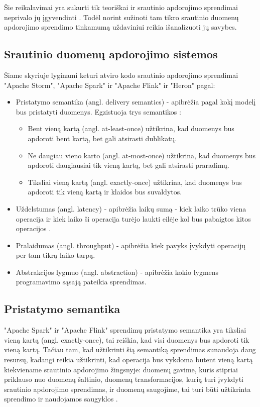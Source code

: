 \documentclass{VUMIFPSbakalaurinis}
\begin{document}
Šie reikalavimai yra sukurti tik teoriškai ir srautinio apdorojimo sprendimai neprivalo jų įgyvendinti \cite{stonebraker20058}. 
Todėl norint sužinoti tam tikro srautinio duomenų apdorojimo sprendimo tinkamumą uždaviniui reikia išanalizuoti jų savybes.   
\subsection{Srautinio duomenų apdorojimo sistemos}

Šiame skyriuje lyginami keturi atviro kodo srautinio apdorojimo sprendimai "Apache Storm", "Apache Spark" ir "Apache Flink" ir "Heron" pagal:
\begin{itemize}
    \item Pristatymo semantika (angl. delivery semantics) - apibrėžia pagal kokį modelį bus pristatyti duomenys. Egzistuoja trys semantikos \cite{ensar20}: 
    \begin{itemize}
        \item Bent vieną kartą (angl. at-least-once) užtikrina, kad duomenys bus apdoroti bent kartą, bet gali atsirasti dublikatų. 
        \item Ne daugiau vieno karto (angl. at-most-once) užtikrina, kad duomenys bus apdoroti daugiausiai tik vieną kartą, bet gali atsirasti praradimų. 
        \item Tiksliai vieną kartą (angl. exactly-once) užtikrina, kad duomenys bus apdoroti tik vieną kartą ir klaidos bus suvaldytos.
    \end{itemize}
    \item Uždelstumas (angl. latency) - apibrėžia laikų sumą - kiek laiko trūko viena operacija ir kiek laiko ši operacija turėjo laukti eilėje kol bus pabaigtos kitos operacijos \cite{karimov2018benchmarking}.
    \item Pralaidumas (angl. throughput) - apibrėžia kiek pavyks įvykdyti operacijų per tam tikrą laiko tarpą.
    \item Abstrakcijos lygmuo (angl. abstraction) - apibrėžia kokio lygmens programavimo sąsają pateikia sprendimas.
\end{itemize}

\subsection{Pristatymo semantika}
"Apache Spark" ir "Apache Flink" sprendimų pristatymo semantika yra tiksliai vieną kartą (angl. exactly-once), tai reiškia, kad visi duomenys bus apdoroti tik vieną kartą. Tačiau tam, kad užtikrinti šią semantiką sprendimas sunaudoja daug resursų, kadangi reikia užtikrinti, kad operacija bus vykdoma būtent vieną kartą kiekviename srautinio apdorojimo žingsnyje: duomenų gavime, kuris stipriai priklauso nuo duomenų šaltinio, duomenų transformacijos, kurią turi įvykdyti srautinio apdorojimo sprendimas, ir duomenų saugojime, tai turi būti užtikrinta sprendimo ir naudojamos saugyklos \cite{zhang20}.\par
\end{document}
